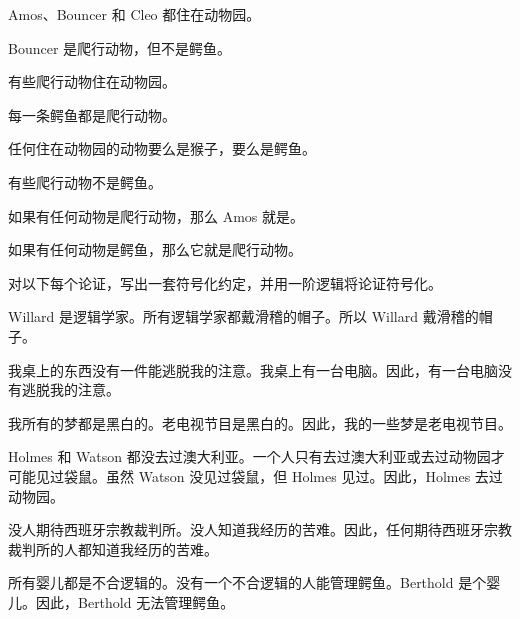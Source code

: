 \begin{compactlist}
\item Amos、Bouncer 和 Cleo 都住在动物园。
\item Bouncer 是爬行动物，但不是鳄鱼。
\item 有些爬行动物住在动物园。
\item 每一条鳄鱼都是爬行动物。
\item 任何住在动物园的动物要么是猴子，要么是鳄鱼。
\item 有些爬行动物不是鳄鱼。
\item 如果有任何动物是爬行动物，那么 Amos 就是。
\item 如果有任何动物是鳄鱼，那么它就是爬行动物。
\end{compactlist}

\problempart
\label{pr.FOLarguments}
对以下每个论证，写出一套符号化约定，并用一阶逻辑将论证符号化。

\begin{compactlist}
\item Willard 是逻辑学家。所有逻辑学家都戴滑稽的帽子。所以 Willard 戴滑稽的帽子。
\item 我桌上的东西没有一件能逃脱我的注意。我桌上有一台电脑。因此，有一台电脑没有逃脱我的注意。
\item 我所有的梦都是黑白的。老电视节目是黑白的。因此，我的一些梦是老电视节目。
\item Holmes 和 Watson 都没去过澳大利亚。一个人只有去过澳大利亚或去过动物园才可能见过袋鼠。虽然 Watson 没见过袋鼠，但 Holmes 见过。因此，Holmes 去过动物园。
\item 没人期待西班牙宗教裁判所。没人知道我经历的苦难。因此，任何期待西班牙宗教裁判所的人都知道我经历的苦难。
\item 所有婴儿都是不合逻辑的。没有一个不合逻辑的人能管理鳄鱼。Berthold 是个婴儿。因此，Berthold 无法管理鳄鱼。
\end{compactlist}

